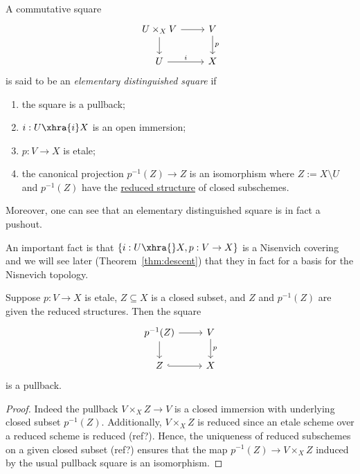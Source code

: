 \documentclass[12pt]{article}
\numberwithin{equation}{section}
\numberwithin{lemma}{section}
\numberwithin{theorem}{section}
\numberwithin{proposition}{section}
\numberwithin{corollary}{section}
\numberwithin{definition}{section}
\numberwithin{example}{section}
\numberwithin{remark}{section}
\begin{document}
\begin{definition}\label{def:elementary-distinguished-square}
  A commutative square
  \begin{equation*}\label{eq:elementary-distinguished-square}
    \begin{tikzcd}
      U \times_X V \arrow[d] \arrow[r] & V \arrow[d, "p"] \\
      U \arrow[r, "i"] & X
    \end{tikzcd}
  \end{equation*}
  is said to be an \emph{elementary distinguished square} if
  \begin{enumerate}[label=(\arabic*)]
  \item the square is a pullback;
  \item $i : U \xhra{i} X$ is an open immersion;
  \item $p : V \to X$ is etale;
  \item the canonical projection $p^{-1}(Z) \to Z$ is an isomorphism
    where $Z := X \setminus U$ and $p^{-1}(Z)$ have the
    \href{https://stacks.math.columbia.edu/tag/01J4}{reduced
      structure} of closed subschemes.
  \end{enumerate}
  Moreover, one can see that an elementary distinguished square is in
  fact a pushout.

  An important fact is that $\{i : U \xhra{} X, p : V \to X\}$ is a
  Nisenvich covering and we will see later (Theorem~\ref{thm:descent})
  that they in fact for a basis for the Nisnevich topology.
\end{definition}

\begin{lemma}
  Suppose $p : V \to X$ is etale, $Z \subseteq X$ is a closed subset,
  and $Z$ and $p^{-1}(Z)$ are given the reduced structures. Then the
  square
  \begin{equation*}
    \begin{tikzcd}
      p^{-1}(Z) \arrow[d] \arrow[r] & V \arrow[d, "p"] \\
      Z \arrow[r, hook]                             & X
    \end{tikzcd}
  \end{equation*}
  is a pullback.
\end{lemma}

\begin{proof}
  Indeed the pullback $V \times_X Z \to V$ is a closed immersion with
  underlying closed subset $p^{-1}(Z)$. Additionally, $V \times_X Z$
  is reduced since an etale scheme over a reduced scheme is reduced
  (ref?). Hence, the uniqueness of reduced subschemes on a given
  closed subset (ref?) ensures that the map
  $p^{-1}(Z) \to V \times_{X} Z$ induced by the usual pullback square
  is an isomorphism.
\end{proof}
\end{document}
